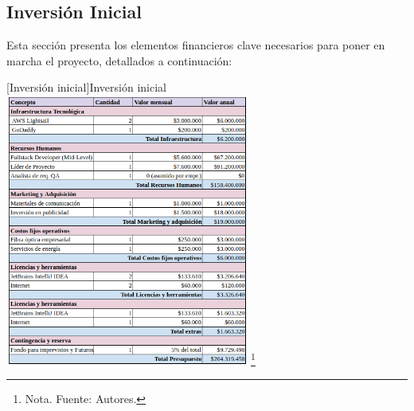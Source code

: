 \subsection{Inversión Inicial}

Esta sección presenta los elementos financieros clave necesarios para poner en marcha el proyecto, detallados a continuación:

  \vspace{2mm}
    \begin{minipage}{0.9\textwidth}
    \centering
    [{Inversión inicial}]{Inversión inicial}
    \label{InversionInicial}
    \includegraphics[width=0.6\textwidth]{Content/Images/AF/InversionInicial.png}
    \footnote{Nota. \textup{Fuente: Autores.}}
    \end{minipage}
